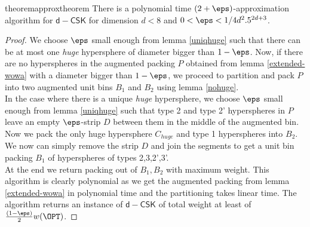 \begin{restatable}{theorem}{approxtheorem}
	There is a polynomial time $(2+\eps)$-approximation algorithm for $\mathsf{d-CSK}$ for dimension $d<8$ and $0<\eps<1/4d^2.5^{2d+3}$.
\end{restatable}
\begin{proof}
	We choose $\eps$ small enough from lemma \ref{uniqhuge} such that there can be at most one \textit{huge} hypersphere of diameter bigger than $1-\eps$. Now, if there are no hyperspheres in the augmented packing $P$ obtained from lemma \ref{extended-wowa} with a diameter bigger than $1-\eps$, we proceed to partition and pack $P$ into two augmented unit bins $B_1$ and $B_2$ using lemma \ref{nohuge}. 
	\\In the case where there is a unique \textit{huge} hypersphere, we choose $\eps$ small enough from lemma \ref{uniqhuge} such that type 2 and type 2' hyperspheres in $P$ leave an empty $\eps$-strip $D$ between them in the middle of the augmented bin. Now we pack the only huge hypersphere $C_{huge}$ and type 1 hyperspheres into $B_2$. We now can simply remove the strip $D$ and join the segments to get a unit bin packing $B_1$ of hyperspheres of types 2,3,2',3'.
	\\At the end we return packing out of $B_1,B_2$ with maximum weight. This algorithm is clearly polynomial as we get the augmented packing from lemma \ref{extended-wowa} in polynomial time and the partitioning takes linear time. The algorithm returns an instance of $\mathsf{d-CSK}$ of total weight at least of $\frac{(1-\eps)}{2}w(\OPT)$.
\end{proof}